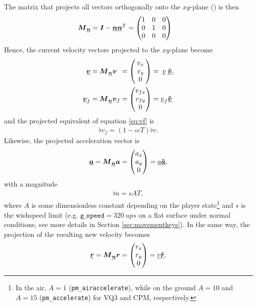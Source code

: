 The matrix that projects all vectors orthogonally onto the $xy$-plane (\greenarea) is then
\begin{align*}
\resprojmat{\flat{n}} = \mat{I} - \vec{\flat{n}} \vec{\flat{n}}^T &=
\begin{pmatrix}
1 & 0 & 0\\
0 & 1 & 0\\
0 & 0 & 0
\end{pmatrix}
\end{align*}
Hence, the current velocity vectors projected to the $xy$-plane become
\begin{align*}
\vec{\flat{v}} &= \resprojmat{\flat{n}} \vec{v}\hphantom{_f} =
\begin{pmatrix}
\mathmakebox[\widthof{$v_{fx}$}]{v_x} \\ v_y \\0
\end{pmatrix} = \mathmakebox[\widthof{$\flat{v}_f$}]{\flat{v}} \uvec{\flat{v}},\\
\vec{\flat{v}}_f &= \resprojmat{\flat{n}} \vec{v}_f =
\begin{pmatrix}
v_{fx} \\ v_{fy} \\0
\end{pmatrix} = \flat{v}_f \uvec{\flat{v}}
\end{align*}
and the projected equivalent of equation \eqref{eq:vf} is
\begin{align}
\label{eq:flat_vf}
\flat{v}_f = (1 - \iota cT) \flat{v}.
\end{align}
Likewise, the projected acceleration vector is
\begin{align}
\label{eq:accel_direction}
\vec{\flat{a}} = \resprojmat{\flat{n}} \vec{a} =
\begin{pmatrix}
a_x \\ a_y \\0
\end{pmatrix} = \flat{a} \uvec{\flat{a}},
\end{align}
with a magnitude
\begin{align}
\label{eq:sAT}
\flat{a} = sAT,
\end{align}
where $A$ is some dimensionless constant depending on the player state\footnote{In the air, $A = 1$ (\texttt{pm\_airaccelerate}), while on the ground $A = 10$ and $A = 15$ (\texttt{pm\_accelerate}) for VQ3 and CPM, respectively.} and $s$ is the wishspeed limit (e.g. $\texttt{g\_speed} = \qty{320}{ups}$ on a flat surface under normal conditions, see more details in Section \ref{sec:movementkeys}). In the same way, the projection of the resulting new velocity becomes
\begin{align*}
\vec{\flat{r}} = \resprojmat{\flat{n}} \vec{r} =
\begin{pmatrix}
r_x \\ r_y \\0
\end{pmatrix} = \flat{r} \uvec{\flat{r}}.
\end{align*}

